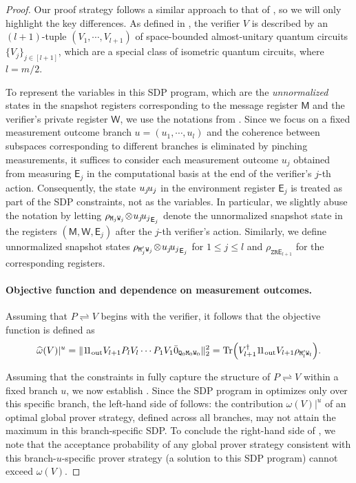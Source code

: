 \documentclass[11pt, a4paper]{article}
\numberwithin{equation}{section}
\numberwithin{figure}{section}
\newcommand{\protocol}[2]{{#1}\!\rightleftharpoons\!{#2}}
\DeclarePairedDelimiter\rbra{\lparen}{\rparen}
\let\ket\relax\DeclarePairedDelimiter\ket{\lvert}{\rangle}
\let\bra\relax\DeclarePairedDelimiter\bra{\langle}{\rvert}
\newcommand{\ketbra}[2]{\ensuremath{\ket{#1}\!\bra{#2}}}
\newcommand{\Tr}{\mathrm{Tr}}
\newcommand{\Out}{\mathrm{out}}
\newcommand{\sfE}{\mathsf{E}}
\newcommand{\sfM}{\mathsf{M}}
\newcommand{\sfW}{\mathsf{W}}
\newcommand{\ttM}{\mathtt{M}}
\newcommand{\ttQ}{\mathtt{Q}}
\newcommand{\ttR}{\mathtt{R}}
\newcommand{\ttW}{\mathtt{W}}
\newcommand{\ttZ}{\mathtt{Z}}
\begin{document}
\begin{proof}
    Our proof strategy follows a similar approach to that of , so we will only highlight the key differences. 
    As defined in , the verifier $V$ is described by an $(l+1)$-tuple $(V_1,\cdots,V_{l+1})$ of space-bounded almost-unitary quantum circuits $\{V_j\}_{j \in [l+1]}$, which are a special class of isometric quantum circuits, where $l = m/2$. 
    
    To represent the variables in this SDP program, which are the \textit{unnormalized} states in the snapshot registers corresponding to the message register $\sfM$ and the verifier's private register $\sfW$, we use the notations from . 
    Since we focus on a fixed measurement outcome branch $u=(u_1,\cdots,u_l)$ and the coherence between subspaces corresponding to different branches is eliminated by pinching measurements, it suffices to consider each measurement outcome $u_j$ obtained from measuring $\sfE_j$ in the computational basis at the end of the verifier's $j$-th action. Consequently, the state $\ketbra{u_j}{u_j}$ in the environment register $\sfE_j$ is treated as part of the SDP constraints, not as the variables. 
    In particular, we slightly abuse the notation by letting $\rho_{\ttM_j\ttW_j}\!\otimes\! \ketbra{u_j}{u_j}_{\sfE_j}$ denote the unnormalized snapshot state in the registers $(\sfM,\sfW,\sfE_j)$ after the $j$-th verifier's action. Similarly, we define unnormalized snapshot states $\rho_{\ttM'_j\ttW_j} \!\otimes\! \ketbra{u_j}{u_j}_{\sfE_j}$ for $1 \leq j \leq l$ and $\rho_{\ttZ\ttR\sfE_{l+1}}$ for the corresponding registers. 

    \paragraph{Objective function and dependence on measurement outcomes.}
    Assuming that $\protocol{P}{V}$ begins with the verifier, it follows that the objective function is defined as
    \begin{equation}
        \label{QIPL-objective-function}
        \widehat{\omega}(V)|^u = \| \ketbra{1}{1}_{\Out} V_{l+1} P_l V_l \cdots P_1 V_1 \ket{\bar{0}}_{\ttQ_0\ttM_0\ttW_0}\|_2^2
        = \Tr\rbra*{ V_{l+1}^{\dagger} \ketbra{1}{1}_{\Out} V_{l+1} \rho_{\ttM'_l\ttW_l} }. 
    \end{equation}

    Assuming that the constraints in  fully capture the structure of $\protocol{P}{V}$ within a fixed branch $u$, we now establish . 
    Since the SDP program in  optimizes only over this specific branch, the left-hand side of  follows: the contribution $\omega(V)|^u$ of an optimal global prover strategy, defined across all branches, may not attain the maximum in this branch-specific SDP. To conclude the right-hand side of , we note that the acceptance probability of any global prover strategy consistent with this branch-$u$-specific prover strategy (a solution to this SDP program) cannot exceed $\omega(V)$. 


\end{proof}
\end{document}
